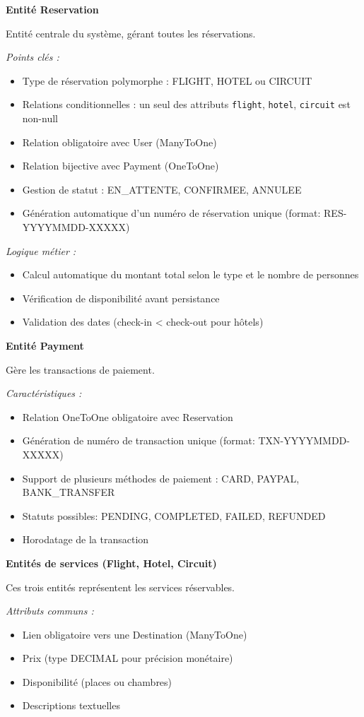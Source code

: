 \documentclass[12pt,a4paper]{report}
\begin{document}
\textbf{Entité Reservation}

Entité centrale du système, gérant toutes les réservations.

\textit{Points clés :}
\begin{itemize}
    \item Type de réservation polymorphe : FLIGHT, HOTEL ou CIRCUIT
    \item Relations conditionnelles : un seul des attributs \texttt{flight}, \texttt{hotel}, \texttt{circuit} est non-null
    \item Relation obligatoire avec User (ManyToOne)
    \item Relation bijective avec Payment (OneToOne)
    \item Gestion de statut : EN\_ATTENTE, CONFIRMEE, ANNULEE
    \item Génération automatique d'un numéro de réservation unique (format: RES-YYYYMMDD-XXXXX)
\end{itemize}

\textit{Logique métier :}
\begin{itemize}
    \item Calcul automatique du montant total selon le type et le nombre de personnes
    \item Vérification de disponibilité avant persistance
    \item Validation des dates (check-in < check-out pour hôtels)
\end{itemize}

\textbf{Entité Payment}

Gère les transactions de paiement.

\textit{Caractéristiques :}
\begin{itemize}
    \item Relation OneToOne obligatoire avec Reservation
    \item Génération de numéro de transaction unique (format: TXN-YYYYMMDD-XXXXX)
    \item Support de plusieurs méthodes de paiement : CARD, PAYPAL, BANK\_TRANSFER
    \item Statuts possibles: PENDING, COMPLETED, FAILED, REFUNDED
    \item Horodatage de la transaction
\end{itemize}

\textbf{Entités de services (Flight, Hotel, Circuit)}

Ces trois entités représentent les services réservables.

\textit{Attributs communs :}
\begin{itemize}
    \item Lien obligatoire vers une Destination (ManyToOne)
    \item Prix (type DECIMAL pour précision monétaire)
    \item Disponibilité (places ou chambres)
    \item Descriptions textuelles
\end{itemize}
\end{document}
